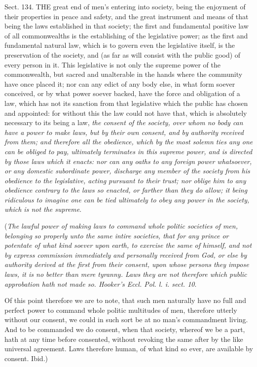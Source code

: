 \documentclass[11pt,openany]{book}
\begin{document}
Sect. 134. THE great end of men's entering into society, being the enjoyment of their properties in peace and safety, and the great instrument and means of that being the laws established in that society; the first and fundamental positive law of all commonwealths is the establishing of the legislative power; as the first and fundamental natural law, which is to govern even the legislative itself, is the preservation of the society, and (as far as will consist with the public good) of every person in it. This legislative is not only the supreme power of the commonwealth, but sacred and unalterable in the hands where the community have once placed it; nor can any edict of any body else, in what form soever conceived, or by what power soever backed, have the force and obligation of a law, which has not its sanction from that legislative which the public has chosen and appointed: for without this the law could not have that, which is absolutely necessary to its being a law, \emph{the consent of the society, over whom no body can have a power to make laws, but by their own consent, and by authority received from them; and therefore all the obedience, which by the most solemn ties any one can be obliged to pay, ultimately terminates in this supreme power, and is directed by those laws which it enacts: nor can any oaths to any foreign power whatsoever, or any domestic subordinate power, discharge any member of the society from his obedience to the legislative, acting pursuant to their trust; nor oblige him to any obedience contrary to the laws so enacted, or farther than they do allow; it being ridiculous to imagine one can be tied ultimately to obey any power in the society, which is not the supreme}.

(\emph{The lawful power of making laws to command whole politic societies of men, belonging so properly unto the same intire societies, that for any prince or potentate of what kind soever upon earth, to exercise the same of himself, and not by express commission immediately and personally received from God, or else by authority derived at the first from their consent, upon whose persons they impose laws, it is no better than mere tyranny. Laws they are not therefore which public approbation hath not made so. Hooker's Eccl. Pol. l. i. sect. 10}.

Of this point therefore we are to note, that such men naturally have no full and perfect power to command whole politic multitudes of men, therefore utterly without our consent, we could in such sort be at no man's commandment living. And to be commanded we do consent, when that society, whereof we be a part, hath at any time before consented, without revoking the same after by the like universal agreement. Laws therefore human, of what kind so ever, are available by consent. Ibid.)
\end{document}
